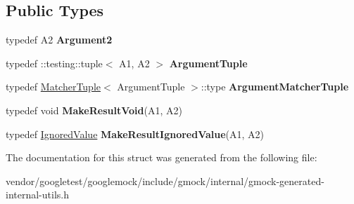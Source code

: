 \subsection*{Public Types}
\begin{DoxyCompactItemize}
\item 
typedef A2 {\bfseries Argument2}\hypertarget{structtesting_1_1internal_1_1Function_3_01R_07A1_00_01A2_08_4_a025f5192252366d73aa19718bb0ea89d}{}\label{structtesting_1_1internal_1_1Function_3_01R_07A1_00_01A2_08_4_a025f5192252366d73aa19718bb0ea89d}

\item 
typedef \+::testing\+::tuple$<$ A1, A2 $>$ {\bfseries Argument\+Tuple}\hypertarget{structtesting_1_1internal_1_1Function_3_01R_07A1_00_01A2_08_4_a2de00437877c29ec6cb78396928b8e3e}{}\label{structtesting_1_1internal_1_1Function_3_01R_07A1_00_01A2_08_4_a2de00437877c29ec6cb78396928b8e3e}

\item 
typedef \hyperlink{structtesting_1_1internal_1_1MatcherTuple}{Matcher\+Tuple}$<$ Argument\+Tuple $>$\+::type {\bfseries Argument\+Matcher\+Tuple}\hypertarget{structtesting_1_1internal_1_1Function_3_01R_07A1_00_01A2_08_4_ad07042129ff6370f55a279ad12f5e80f}{}\label{structtesting_1_1internal_1_1Function_3_01R_07A1_00_01A2_08_4_ad07042129ff6370f55a279ad12f5e80f}

\item 
typedef void {\bfseries Make\+Result\+Void}(A1, A2)\hypertarget{structtesting_1_1internal_1_1Function_3_01R_07A1_00_01A2_08_4_ada1ad22fa21c84ec3faea47ed20c1b46}{}\label{structtesting_1_1internal_1_1Function_3_01R_07A1_00_01A2_08_4_ada1ad22fa21c84ec3faea47ed20c1b46}

\item 
typedef \hyperlink{classtesting_1_1internal_1_1IgnoredValue}{Ignored\+Value} {\bfseries Make\+Result\+Ignored\+Value}(A1, A2)\hypertarget{structtesting_1_1internal_1_1Function_3_01R_07A1_00_01A2_08_4_a89033ea870fe831b13899ce36666e102}{}\label{structtesting_1_1internal_1_1Function_3_01R_07A1_00_01A2_08_4_a89033ea870fe831b13899ce36666e102}

\end{DoxyCompactItemize}


The documentation for this struct was generated from the following file\+:\begin{DoxyCompactItemize}
\item 
vendor/googletest/googlemock/include/gmock/internal/gmock-\/generated-\/internal-\/utils.\+h\end{DoxyCompactItemize}
